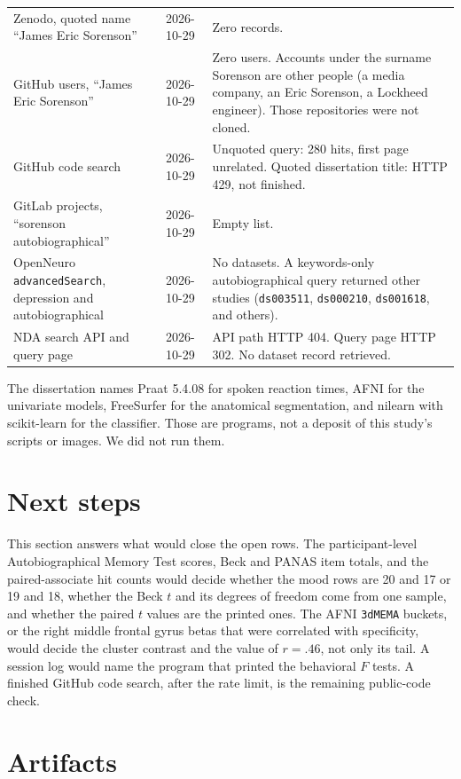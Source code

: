 \documentclass[11pt]{article}
\begin{document}
\begin{footnotesize}
\begin{longtable}{@{}L{0.34\textwidth}L{0.16\textwidth}L{0.42\textwidth}@{}}
Zenodo, quoted name ``James Eric Sorenson''
& 2026-10-29 &
Zero records. \\
GitHub users, ``James Eric Sorenson''
& 2026-10-29 &
Zero users. Accounts under the surname Sorenson are other people
(a media company, an Eric Sorenson, a Lockheed engineer).
Those repositories were not cloned. \\
GitHub code search
& 2026-10-29 &
Unquoted query: 280 hits, first page unrelated.
Quoted dissertation title: HTTP 429, not finished. \\
GitLab projects, ``sorenson autobiographical''
& 2026-10-29 &
Empty list. \\
OpenNeuro \texttt{advancedSearch}, depression and autobiographical
& 2026-10-29 &
No datasets. A keywords-only autobiographical query returned other
studies (\texttt{ds003511}, \texttt{ds000210}, \texttt{ds001618}, and
others). \\
NDA search API and query page
& 2026-10-29 &
API path HTTP 404. Query page HTTP 302. No dataset record retrieved. \\
\bottomrule
\end{longtable}
\end{footnotesize}

The dissertation names Praat 5.4.08 for spoken reaction times, AFNI for the
univariate models, FreeSurfer for the anatomical segmentation, and nilearn
with scikit-learn for the classifier.
Those are programs, not a deposit of this study's scripts or images.
We did not run them.

\section{Next steps}
\label{sec:next}

This section answers what would close the open rows.
The participant-level Autobiographical Memory Test scores, Beck and PANAS
item totals, and the paired-associate hit counts would decide whether the
mood rows are 20 and 17 or 19 and 18, whether the Beck \(t\) and its degrees
of freedom come from one sample, and whether the paired \(t\) values are the
printed ones.
The AFNI \texttt{3dMEMA} buckets, or the right middle frontal gyrus betas
that were correlated with specificity, would decide the cluster contrast and
the value of \(r = .46\), not only its tail.
A session log would name the program that printed the behavioral \(F\) tests.
A finished GitHub code search, after the rate limit, is the remaining
public-code check.

\section{Artifacts}
\label{app:artifacts}
\end{document}
